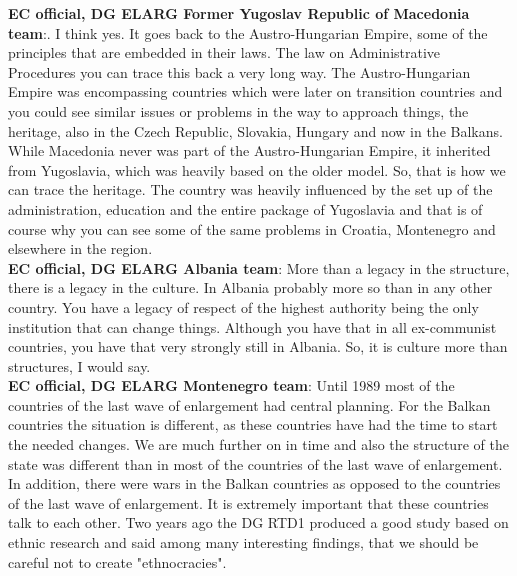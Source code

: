 \textbf{EC official, DG ELARG Former Yugoslav Republic of Macedonia team}:. I think yes. It goes back to the Austro-Hungarian Empire, some of the principles that are embedded in their laws. The law on Administrative Procedures you can trace this back a very long way. The Austro-Hungarian Empire was encompassing countries which were later on transition countries and you could see similar issues or problems in the way to approach things, the heritage, also in the Czech Republic, Slovakia, Hungary and now in the Balkans. While Macedonia never was part of the Austro-Hungarian Empire, it inherited from Yugoslavia, which was heavily based on the older model. So, that is how we can trace the heritage. The country was heavily influenced by the set up of the administration, education and the entire package of Yugoslavia and that is of course why you can see some of the same problems in Croatia, Montenegro and elsewhere in the region. \\
\textbf{EC official, DG ELARG Albania team}: More than a legacy in the structure, there is a legacy in the culture. In Albania probably more so than in any other country. You have a legacy of respect of the highest authority being the only institution that can change things. Although you have that in all ex-communist countries, you have that very strongly still in Albania. So, it is culture more than structures, I would say.\\
\textbf{EC official, DG ELARG Montenegro team}: Until 1989 most of the countries of the last wave of enlargement had central planning. For the Balkan countries the situation is different, as these countries have had the time to start the needed changes. We are much further on in time and also the structure of the state was different than in most of the countries of the last wave of enlargement. In addition, there were wars in the Balkan countries as opposed to the countries of the last wave of enlargement. It is extremely important that these countries talk to each other. Two years ago the DG RTD1 produced a good study based on ethnic research and said among many interesting findings, that we should be careful not to create "ethnocracies".\\
